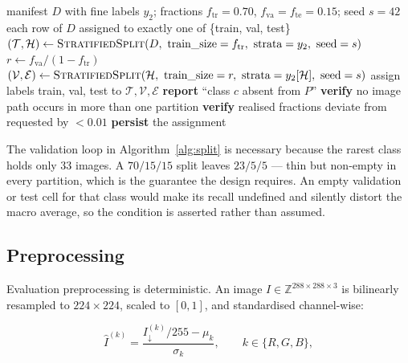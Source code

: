 \documentclass[11pt,a4paper]{article}
\begin{document}
\begin{algorithm}[H]
\caption{Deterministic stratified partitioning}
\label{alg:split}
\begin{algorithmic}[1]
\Require manifest $D$ with fine labels $y_2$; fractions $f_{\text{tr}}=0.70$,
         $f_{\text{va}}=f_{\text{te}}=0.15$; seed $s = 42$
\Ensure each row of $D$ assigned to exactly one of \{train, val, test\}
\State $(\mathcal{T}, \mathcal{H}) \gets \textproc{StratifiedSplit}(D,\ \text{train\_size}=f_{\text{tr}},\ \text{strata}=y_2,\ \text{seed}=s)$
\State $r \gets f_{\text{va}} / (1 - f_{\text{tr}})$ 
\State $(\mathcal{V}, \mathcal{E}) \gets \textproc{StratifiedSplit}(\mathcal{H},\ \text{train\_size}=r,\ \text{strata}=y_2[\mathcal{H}],\ \text{seed}=s)$
\State assign labels train, val, test to $\mathcal{T}, \mathcal{V}, \mathcal{E}$
      \State \textbf{report} ``class $c$ absent from $P$'' 
    \EndIf
  \EndFor
\EndFor
\State \textbf{verify} no image path occurs in more than one partition
\State \textbf{verify} realised fractions deviate from requested by $< 0.01$
\State \textbf{persist} the assignment
\end{algorithmic}
\end{algorithm}

The validation loop in Algorithm~\ref{alg:split} is necessary because the rarest
class holds only 33 images. A $70/15/15$ split leaves $23/5/5$ --- thin but
non-empty in every partition, which is the guarantee the design requires. An
empty validation or test cell for that class would make its recall undefined and
silently distort the macro average, so the condition is asserted rather than
assumed.

\subsection{Preprocessing}

Evaluation preprocessing is deterministic. An image $I \in
\mathbb{Z}^{288\times288\times3}$ is bilinearly resampled to $224 \times 224$,
scaled to $[0,1]$, and standardised channel-wise:

\begin{equation}
  \hat{I}^{(k)} = \frac{I_{\downarrow}^{(k)}/255 - \mu_k}{\sigma_k},
  \qquad k \in \{R, G, B\},
  \label{eq:norm}
\end{equation}
\end{document}
